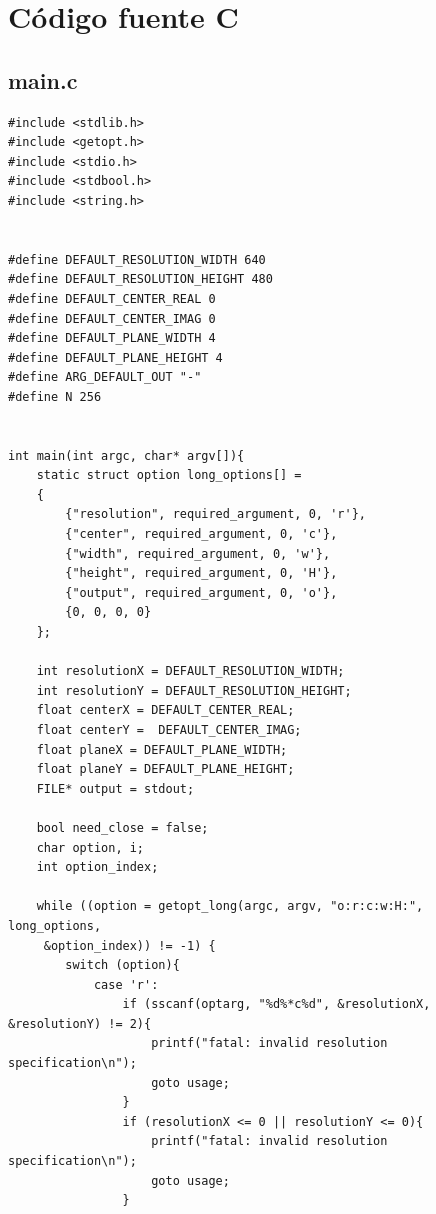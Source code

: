 \documentclass[a4paper,10pt]{article}
\begin{document}
\section{C\'odigo fuente C}

\subsection{main.c}

\begin{verbatim}
#include <stdlib.h>
#include <getopt.h>
#include <stdio.h>
#include <stdbool.h>
#include <string.h>


#define DEFAULT_RESOLUTION_WIDTH 640
#define DEFAULT_RESOLUTION_HEIGHT 480
#define DEFAULT_CENTER_REAL 0
#define DEFAULT_CENTER_IMAG 0
#define DEFAULT_PLANE_WIDTH 4
#define DEFAULT_PLANE_HEIGHT 4
#define ARG_DEFAULT_OUT "-"
#define N 256


int main(int argc, char* argv[]){
    static struct option long_options[] =
    {
        {"resolution", required_argument, 0, 'r'},
        {"center", required_argument, 0, 'c'},
        {"width", required_argument, 0, 'w'},
        {"height", required_argument, 0, 'H'},
        {"output", required_argument, 0, 'o'},
        {0, 0, 0, 0}
    };

    int resolutionX = DEFAULT_RESOLUTION_WIDTH;
    int resolutionY = DEFAULT_RESOLUTION_HEIGHT;
    float centerX = DEFAULT_CENTER_REAL;
    float centerY =  DEFAULT_CENTER_IMAG;
    float planeX = DEFAULT_PLANE_WIDTH;
    float planeY = DEFAULT_PLANE_HEIGHT;
    FILE* output = stdout;

    bool need_close = false;
    char option, i;
    int option_index;

    while ((option = getopt_long(argc, argv, "o:r:c:w:H:", long_options,
     &option_index)) != -1) {
        switch (option){
            case 'r':
                if (sscanf(optarg, "%d%*c%d", &resolutionX, &resolutionY) != 2){
                    printf("fatal: invalid resolution specification\n");
                    goto usage;
                }
                if (resolutionX <= 0 || resolutionY <= 0){
                    printf("fatal: invalid resolution specification\n");
                    goto usage;
                }


\end{verbatim}
\end{document}
